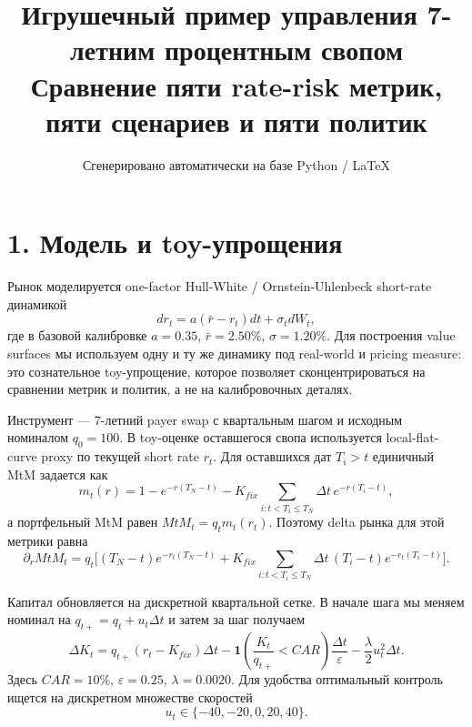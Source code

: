 \documentclass[11pt,a4paper]{article}
\title{Игрушечный пример управления 7-летним процентным свопом\\[2mm]
\large Сравнение пяти rate-risk метрик, пяти сценариев и пяти политик}
\author{Сгенерировано автоматически на базе Python / LaTeX}
\date{}
\begin{document}
\maketitle

\begin{center}
\end{center}

\section*{1. Модель и toy-упрощения}
Рынок моделируется one-factor Hull-White / Ornstein-Uhlenbeck short-rate динамикой
\[
 dr_t = a(\bar r - r_t)dt + \sigma_t dW_t,
\]
где в базовой калибровке $a=0.35$, $\bar r=2.50\%$, $\sigma=1.20\%$. Для построения value surfaces мы используем одну и ту же динамику под real-world и pricing measure: это сознательное toy-упрощение, которое позволяет сконцентрироваться на сравнении метрик и политик, а не на калибровочных деталях.

Инструмент --- 7-летний payer swap с квартальным шагом и исходным номиналом $q_0=100$. В toy-оценке оставшегося свопа используется local-flat-curve proxy по текущей short rate $r_t$. Для оставшихся дат $T_i>t$ единичный MtM задается как
\[
 m_t(r) = 1 - e^{-r(T_N-t)} - K_{fix}\sum_{i:t<T_i\le T_N} \Delta t\, e^{-r(T_i-t)},
\]
а портфельный MtM равен $MtM_t = q_t m_t(r_t)$. Поэтому delta рынка для этой метрики равна
\[
 \partial_r MtM_t = q_t\Bigg[(T_N-t)e^{-r_t(T_N-t)} + K_{fix}\sum_{i:t<T_i\le T_N} \Delta t\,(T_i-t)e^{-r_t(T_i-t)}\Bigg].
\]

Капитал обновляется на дискретной квартальной сетке. В начале шага мы меняем номинал на $q_{t+} = q_t + u_t\Delta t$ и затем за шаг получаем
\[
 \Delta K_t = q_{t+}(r_t-K_{fix})\Delta t
 - \mathbf{1}\!\left(\frac{K_t}{q_{t+}}<CAR\right)\frac{\Delta t}{\varepsilon}
 - \frac{\lambda}{2}u_t^2\Delta t.
\]
Здесь $CAR=10\%$, $\varepsilon=0.25$, $\lambda=0.0020$. Для удобства оптимальный контроль ищется на дискретном множестве скоростей
\[
 u_t \in \{-40,-20,0,20,40\}.
\]
\end{document}
